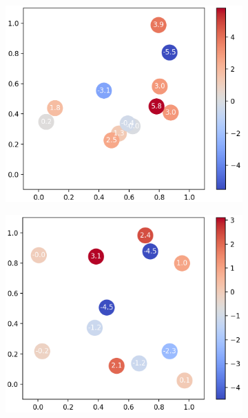 \documentclass[11pt]{article}
\begin{document}
\begin{figure}[H]
	\centering
	\begin{subfigure}[b]{0.325\textwidth}
		\centering
		\includegraphics[width=\textwidth]{assets/1d-1st}
		\caption{}
	\end{subfigure}
	\begin{subfigure}[b]{0.325\textwidth}
		\centering
		\includegraphics[width=\textwidth]{assets/1d-2nd}
		\caption{}
	\end{subfigure}
	\begin{subfigure}[b]{0.325\textwidth}

\end{subfigure}
\end{figure}
\end{document}
